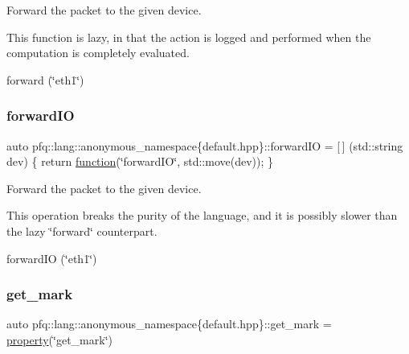 Forward the packet to the given device. 

This function is lazy, in that the action is logged and performed when the computation is completely evaluated.

forward (\char`\"{}eth1\char`\"{}) \mbox{\label{namespacepfq_1_1lang_1_1anonymous__namespace_02default_8hpp_03_a3fb6ec42e38c3329534ea3a7024fd967}} 
\subsubsection{\texorpdfstring{forward\+IO}{forwardIO}}
{\footnotesize\ttfamily auto pfq\+::lang\+::anonymous\+\_\+namespace\{default.\+hpp\}\+::forward\+IO = \mbox{[}$\,$\mbox{]} (std\+::string dev) \{ return \hyperlink{namespacepfq_1_1lang_a1a4638059d700ae08d0ca63886ff2bb3}{function}(\char`\"{}forward\+IO\char`\"{}, std\+::move(dev)); \}}



Forward the packet to the given device. 

This operation breaks the purity of the language, and it is possibly slower than the lazy \char`\"{}forward\char`\"{} counterpart.

forward\+IO (\char`\"{}eth1\char`\"{}) \mbox{\label{namespacepfq_1_1lang_1_1anonymous__namespace_02default_8hpp_03_ab733e24b3ca86450bea0b0888a6327d2}} 
\subsubsection{\texorpdfstring{get\+\_\+mark}{get\_mark}}
{\footnotesize\ttfamily auto pfq\+::lang\+::anonymous\+\_\+namespace\{default.\+hpp\}\+::get\+\_\+mark = \hyperlink{namespacepfq_1_1lang_a1249450e72229273b0db707a286aea91}{property}(\char`\"{}get\+\_\+mark\char`\"{})}




